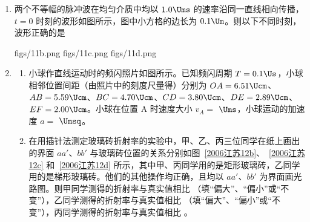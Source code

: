\documentclass[\gkver]{gaokaozhenti}
\begin{document}
\begin{enumerate}

{能用于发电的水的最大重力势能 $E_{p}=\rho Vg\left(H-\frac{d}{2}\right)$}
{电站的总效率达 $75\%$}
{该电站平均每天所发电能可供给一个大城市居民用电（电功率以 $10^{5}\UkW$ 计）约 $10\Uh$}


\item
两个不等幅的脉冲波在均匀介质中均以 $1.0\Ums$ 的速率沿同一直线相向传播，$t=0$ 时刻的波形如图所示，图中小方格的边长为 $0.1\Um$。则以下不同时刻，波形正确的是

\onepicture[w=8.00cm]{}

{figs/11b.png}
{figs/11c.png}
{figs/11d.png}


\item
\begin{enumerate}
	\item
	小球作直线运动时的频闪照片如图所示。已知频闪周期 $T=0.1\Us$，小球相邻位置间距（由照片中的刻度尺量得）分别为 $OA=6.51\Ucm$、$AB=5.59\Ucm$、$BC=4.70\Ucm$、$CD=3.80\Ucm$、$DE=2.89\Ucm$、$EF=2.00\Ucm$。小球在位置 A 时速度大小 $v_{A}=$ \tkanswer[1.5cm]{}$\Ums$，小球运动的加速度 $a=$ \tkanswer[1.5cm]{}$\Umsq$。

	\onepicture[w=10.00cm]{}

	\item
	在用插针法测定玻璃砖折射率的实验中，甲、乙、丙三位同学在纸上画出的界面 $aa'$、$bb'$ 与玻璃砖位置的关系分别如图~\ref{2006江苏12b}、~\ref{2006江苏12c} 和~\ref{2006江苏12d} 所示，其中甲、丙同学用的是矩形玻璃砖，乙同学用的是梯形玻璃砖。他们的其他操作均正确，且均以 $aa'$、$bb'$ 为界面画光路图。则甲同学测得的折射率与真实值相比 \tkanswer[1.5cm]{}（填“偏大”、“偏小”或“不变”），乙同学测得的折射率与真实值相比 \tkanswer[1.5cm]{}（填“偏大”、“偏小”或“不变”），丙同学测得的折射率与真实值相比 \tkanswer[2.5cm]{}。


\end{enumerate}
\end{enumerate}
\end{document}
